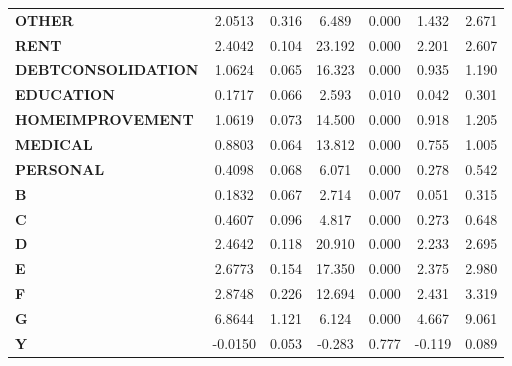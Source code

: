 \documentclass{report}
\begin{document}
\begin{center}
\begin{tabular}{lcccccc}
\textbf{OTHER}                          &       2.0513  &        0.316     &     6.489  &         0.000        &        1.432    &        2.671     \\
\textbf{RENT}                           &       2.4042  &        0.104     &    23.192  &         0.000        &        2.201    &        2.607     \\
\textbf{DEBTCONSOLIDATION}              &       1.0624  &        0.065     &    16.323  &         0.000        &        0.935    &        1.190     \\
\textbf{EDUCATION}                      &       0.1717  &        0.066     &     2.593  &         0.010        &        0.042    &        0.301     \\
\textbf{HOMEIMPROVEMENT}                &       1.0619  &        0.073     &    14.500  &         0.000        &        0.918    &        1.205     \\
\textbf{MEDICAL}                        &       0.8803  &        0.064     &    13.812  &         0.000        &        0.755    &        1.005     \\
\textbf{PERSONAL}                       &       0.4098  &        0.068     &     6.071  &         0.000        &        0.278    &        0.542     \\
\textbf{B}                              &       0.1832  &        0.067     &     2.714  &         0.007        &        0.051    &        0.315     \\
\textbf{C}                              &       0.4607  &        0.096     &     4.817  &         0.000        &        0.273    &        0.648     \\
\textbf{D}                              &       2.4642  &        0.118     &    20.910  &         0.000        &        2.233    &        2.695     \\
\textbf{E}                              &       2.6773  &        0.154     &    17.350  &         0.000        &        2.375    &        2.980     \\
\textbf{F}                              &       2.8748  &        0.226     &    12.694  &         0.000        &        2.431    &        3.319     \\
\textbf{G}                              &       6.8644  &        1.121     &     6.124  &         0.000        &        4.667    &        9.061     \\
\textbf{Y}                              &      -0.0150  &        0.053     &    -0.283  &         0.777        &       -0.119    &        0.089     \\
\bottomrule
\end{tabular}
\end{center}
\end{document}
